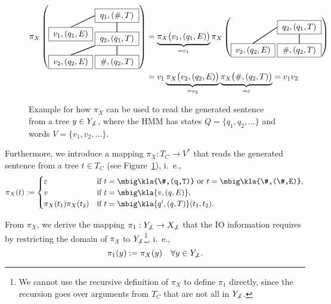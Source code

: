 \begin{figure}[t!]
 \begin{align*}
  \pi_X\left(\begin{tikzpicture}[every node/.style={rectangle,draw,minimum width=1.9cm},baseline=(current bounding box.center)]
   \node (t0) at (0,0) { $q_1,(\#,T)$ };
   \node (t1) at (0,-1) { $q_2,(q_1,T)$ } edge[thick] (t0);
   \node (t2) at (0,-2) { $\#,(q_2,T)$ } edge[thick] (t1);
   \node (e1) at (-2,-0.8) { $v_1,(q_1,E)$ }; \draw [thick] (t0.west) -- (e1.north);
   \node (e2) at (-2,-2) { $v_2,(q_2,E)$ }; \draw [thick] (t1.south west) -- (e2.north);
  \end{tikzpicture}\right)
  &=
   \underbrace{\pi_X\bigl(v_1,(q_1,E)\bigr)}_{=v_1}
   \pi_X\left(\begin{tikzpicture}[every node/.style={rectangle,draw,minimum width=1.9cm},baseline=(current bounding box.center)]
    \node (t1) at (0,0) { $q_2,(q_1,T)$ };
    \node (t2) at (0,-1) { $\#,(q_2,T)$ } edge[thick] (t1);
    \node (e2) at (-2,-1) { $v_2,(q_2,E)$ }; \draw [thick] (t1.west) -- (e2.north);
   \end{tikzpicture}\right)
  \\
  &= v_1
   \underbrace{\pi_X\bigl(v_2,(q_2,E)\bigr)}_{=v_2}
   \underbrace{\pi_X\bigl(\#,(q_2,T)\bigr)}_{=\eps}
   = v_1v_2
 \end{align*}
 \caption{\label{fig:03-readoff}%
  Example for how $\pi_X$ can be used to read the generated sentence from a tree $y\in Y_{\not\bot}$, where the HMM has states $Q = \{q_1,q_2,\ldots\}$ and words $V = \{v_1,v_2,\ldots\}$.
 }
\end{figure}

\label{def:03-def-pi-x}
Furthermore, we introduce a mapping $\pi_X: T_C \to V^*$ that reads the
generated sentence from a tree $t\in T_C$ (see Figure~\ref{fig:03-readoff}),
i.~e.,
\label{eq:03-pi_X}\[
 \pi_X(t) := \begin{cases}
  \eps & \text{if } t = \mbig\kla{\#,(q,T)} \text{ or } t = \mbig\kla{\#,(\#,E)}, \\
  v    & \text{if } t = \mbig\kla{v,(q,E)}, \\
  \pi_X(t_1)\pi_X(t_2) & \text{if } t = \mbig\kla{q',(q,T)}(t_1,t_2).
 \end{cases}
\]

From $\pi_X$, we derive the mapping $\pi_1: Y_{\not\bot} \to X_{\not\bot}$ that
the IO information requires by restricting the domain of $\pi_X$ to
$Y_{\not\bot}$\footnote{We cannot use the recursive definition of $\pi_X$ to
define $\pi_1$ directly, since the recursion goes over arguments from $T_C$
that are not all in $Y_{\not\bot}$.}, i.~e.,
\[
 \pi_1(y) := \pi_X(y) \quad\forall y\in Y_{\not\bot}.
\]

